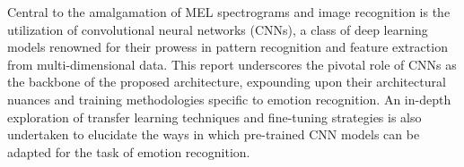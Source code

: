 Central to the amalgamation of MEL spectrograms and image recognition is the utilization of convolutional neural networks (CNNs), a class of deep learning models renowned for their prowess in pattern recognition and feature extraction from multi-dimensional data. This report underscores the pivotal role of CNNs as the backbone of the proposed architecture, expounding upon their architectural nuances and training methodologies specific to emotion recognition. An in-depth exploration of transfer learning techniques and fine-tuning strategies is also undertaken to elucidate the ways in which pre-trained CNN models can be adapted for the task of emotion recognition.